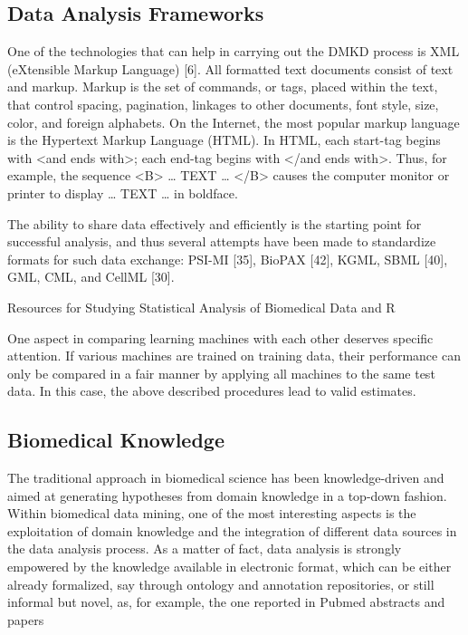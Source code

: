 \documentclass[10pt,a4paper]{article}
\begin{document}
	\subsection{Data Analysis Frameworks}
	
	One of the technologies that can help in carrying out the DMKD process is XML (eXtensible Markup Language) [6]. All formatted text documents consist of text and markup. Markup is the set of commands, or tags, placed within the text, that control spacing, pagination, linkages to other documents, font style, size, color, and foreign alphabets. On the Internet, the most popular markup language is the Hypertext Markup Language (HTML). In HTML, each start-tag begins with <and ends with>; each end-tag begins with </and ends with>. Thus, for example, the sequence <B> … TEXT … </B> causes the computer monitor or printer to display … TEXT … in boldface. \cite{CIOS20021}
	
	The ability to share data effectively and efficiently is the starting point for successful
	analysis, and thus several attempts have been made to standardize formats for such
	data exchange: PSI-MI [35], BioPAX [42], KGML, SBML [40], GML, CML, and
	CellML [30]. \cite{Otasek2014}
	
	Resources for Studying Statistical Analysis
	of Biomedical Data and R \cite{Kobayashi2014}
	
	One aspect in comparing learning machines
	with each other deserves specific attention.
	If various machines are trained on
	training data, their performance can only
	be compared in a fair manner by applying
	all machines to the same test data. In this
	case, the above described procedures lead
	to valid estimates. \cite{bellazzi2011data}
	
	\subsection{Biomedical Knowledge}
	
	The traditional approach in biomedical science has been knowledge-driven and aimed at generating hypotheses from domain knowledge in a top-down fashion. Within biomedical data mining, one of the most
	interesting aspects is the exploitation of domain knowledge and the integration of different data sources in the data analysis process. As a matter of fact, data analysis is strongly empowered by the knowledge available in electronic format, which can be either already formalized, say through ontology and annotation repositories, or still informal but novel, as, for example, the one reported in Pubmed abstracts and papers\cite{bellazzi2011data}
	
\end{document}
